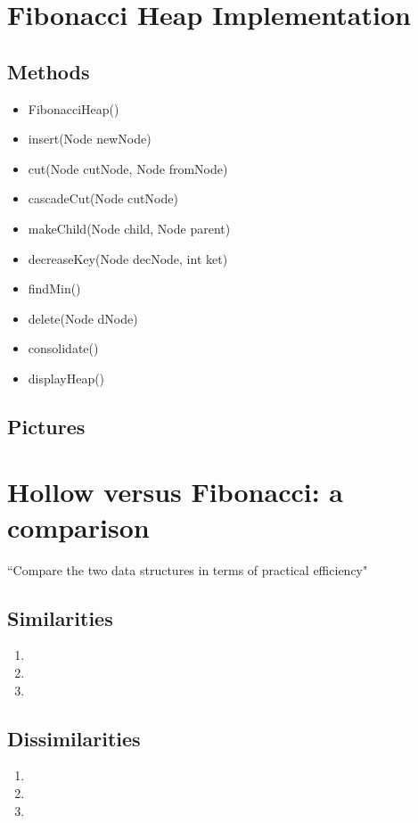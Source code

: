 \documentclass[letter,10pt]{article}
\begin{document}
\section{Fibonacci Heap Implementation} 
\subsection{Methods}
\renewcommand\labelitemi{$\square$}
\begin{itemize}
    \item \quad FibonacciHeap()
    \item \quad insert(Node newNode)
    \item \quad cut(Node cutNode, Node fromNode)
    \item \quad cascadeCut(Node cutNode)
    \item \quad makeChild(Node child, Node parent)
    \item \quad decreaseKey(Node decNode, int ket)
    \item \quad findMin()
    \item \quad delete(Node dNode)
    \item \quad consolidate()
    \item \quad displayHeap()
\end{itemize}
\subsection{Pictures}

\section{Hollow versus Fibonacci: a comparison}
``Compare the two data structures in terms of practical efficiency"
\subsection{Similarities}
\begin{enumerate}
    \item 
    \item
    \item
\end{enumerate}

\subsection{Dissimilarities}
\begin{enumerate}
    \item 
    \item 
    \item 
\end{enumerate}




\newpage
\nocite{*}
\printbibliography
\end{document}
